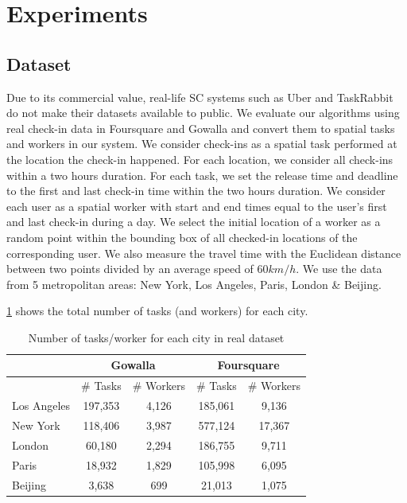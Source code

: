 \section{Experiments}
\label{sec:experiments}


\subsection{Dataset}
\label{subsec:dataset}
Due to its commercial value, real-life SC systems such as Uber and TaskRabbit do not make their datasets available to public. We evaluate our algorithms using real check-in data in Foursquare\cite{Yang16} and Gowalla\cite{Cho11} and convert them to spatial tasks and workers in our system. We consider check-ins as a spatial task performed at the location the check-in happened. For each location, we consider all check-ins within a two hours duration. For each task, we set the release time and deadline to the first and last check-in time within the two hours duration. We consider each user as a spatial worker with start and end times equal to the user's first and last check-in during a day. We select the initial location of a worker as a random point within the bounding box of all checked-in locations of the corresponding user. We also measure the travel time with the Euclidean distance between two points divided by an average speed of $60 km/h$. We use the data from 5 metropolitan areas: New York, Los Angeles, Paris, London \& Beijing. 

\cref{tab:flickr_stats} shows the total number of tasks (and workers) for each city.

\begin{table}[h]
\begin{center}
\begin{tabular}{| l || c | c || c | c |} \hline
			& \multicolumn{2}{c||}{Gowalla}		&\multicolumn{2}{c|}{Foursquare}		\\ \hline
			&	\# Tasks	&	\#  Workers		&	\#  Tasks	&	\#  Workers		\\ \hline
Los Angeles	&	197,353		&		4,126		&	185,061		&		9,136		\\ \hline
New York	&	118,406		&		3,987		&	577,124		& 		17,367		\\ \hline
London		& 	60,180		&		2,294		&	186,755		&		9,711		\\ \hline
Paris		&	18,932		&		1,829		&	105,998		&		6,095		\\ \hline
Beijing		&	3,638		&		699			&	21,013		&		1,075		\\ \hline
\end{tabular}
\vspace{-0.1in}
\caption{\small{Number of tasks/worker for each city in real dataset}}
\label{tab:flickr_stats}
\end{center}
\end{table}

